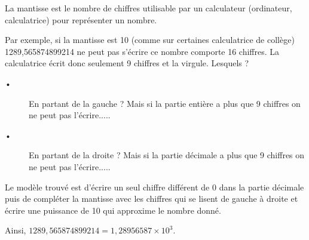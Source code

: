 
La mantisse est le nombre de chiffres utilisable par un calculateur (ordinateur, calculatrice) pour représenter un nombre.

Par exemple, si la mantisse est 10 (comme sur certaines calculatrice de collège) 1289,565874899214 ne peut pas s'écrire ce nombre comporte 16 chiffres. La calculatrice écrit donc seulement 9 chiffres et la virgule. Lesquels ? 

\begin{description}
\item[•] En partant de la gauche ? Mais si la partie entière a plus que 9 chiffres on ne peut pas l'écrire.....
\item[•] En partant de la droite ? Mais si la partie décimale a plus que 9 chiffres on ne peut pas l'écrire.....
\end{description}

Le modèle trouvé est d'écrire un seul chiffre différent de 0 dans la partie décimale puis de compléter la mantisse avec les chiffres qui se lisent de gauche à droite et écrire une puissance de 10 qui approxime le nombre donné. 

Ainsi, $1289,565874899214=1,28956587 \times 10^3$.

